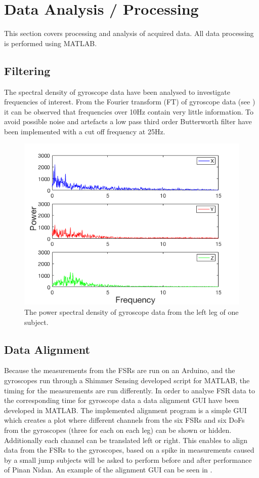 \section{Data Analysis / Processing}
This section covers processing and analysis of acquired data. All data processing is performed using MATLAB. 

\subsection{Filtering} \label{subsec:filtering}
The spectral density of gyroscope data have been analysed to investigate frequencies of interest. From the Fourier transform (FT) of gyroscope data (see ) it can be observed that frequencies over 10Hz contain very little information. To avoid possible noise and artefacts a low pass third order Butterworth filter have been implemented with a cut off frequency at 25Hz. %

\begin{figure}[H]
	\includegraphics[width=.6\textwidth]{figures/gyroFFTPlot}
	\caption{The power spectral density of gyroscope data from the left leg of one subject.}
	\label{fig:gyroFFTPlot}  %
\end{figure}



\subsection{Data Alignment}
Because the measurements from the FSRs are run on an Arduino, and the gyroscopes run through a Shimmer Sensing developed script for MATLAB, the timing for the measurements are run differently. In order to analyse FSR data to the corresponding time for gyroscope data a data alignment GUI have been developed in MATLAB. The implemented alignment program is a simple GUI which creates a plot where different channels from the six FSRs and six DoFs from the gyroscopes (three for each on each leg) can be shown or hidden. Additionally each channel can be translated left or right. This enables to align data from the FSRs to the gyroscopes, based on a spike in measurements caused by a small jump subjects will be asked to perform before and after performance of Pinan Nidan. An example of the alignment GUI can be seen in .

